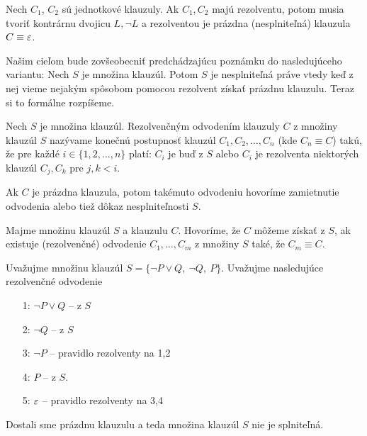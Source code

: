 \begin{poznamka}
    Nech $C_1$, $C_2$ sú jednotkové klauzuly. Ak $C_1,C_2$ majú
    rezolventu, potom musia tvoriť kontrárnu dvojicu $L, \neg L$
    a rezolventou je prázdna (nesplniteľná) klauzula $C \equiv \varepsilon$.
\end{poznamka}

Našim cieľom bude zovšeobecniť predchádzajúcu poznámku do
nasledujúceho variantu: Nech $S$ je množina klauzúl. Potom $S$ je
nesplniteľná práve vtedy keď z nej vieme nejakým spôsobom pomocou
rezolvent získať prázdnu klauzulu.
Teraz si to formálne rozpíšeme.

\begin{definicia}
    Nech $S$ je množina klauzúl.
    Rezolvenčným odvodením klauzuly $C$ z množiny klauzúl $S$
    nazývame konečnú postupnosť klauzúl $C_1, C_2, \ldots, C_n$ 
    (kde $C_n \equiv C$) takú,
    že pre každé $i \in \{1,2,\dots,n\}$ platí:
    $C_i$ je buď z $S$ alebo $C_i$ je rezolventa niektorých klauzúl
    $C_j, C_k$ pre $j, k < i$.

    Ak $C$ je prázdna klauzula, potom takémuto odvodeniu hovoríme 
    zamietnutie odvodenia alebo tiež dôkaz nesplniteľnosti $S$.
\end{definicia}

\begin{definicia}
    Majme množinu klauzúl $S$ a klauzulu $C$.
    Hovoríme, že $C$ môžeme získať z $S$,
    ak existuje (rezolvenčné) odvodenie $C_1, \dots, C_m$ z množiny $S$ také, že
    $C_m \equiv C$.
\end{definicia}

\begin{priklad}
    Uvažujme množinu klauzúl $S=\{\neg P \lor Q,\ \neg Q,\ P\}$.
    Uvažujme nasledujúce rezolvenčné odvodenie
    \begin{itemize} 
	\item[1:] $ \neg P \lor Q $  -- z $S$
	\item[2:] $ \neg Q $ -- z $S$
	\item[3:] $ \neg P $ -- pravidlo rezolventy na 1,2
	\item[4:] $ P $ -- z $S$.
        \item[5:] $\varepsilon$ -- pravidlo rezolventy na 3,4
    \end{itemize}
    Dostali sme prázdnu klauzulu a teda množina klauzúl $S$ nie je
    splniteľná.
\end{priklad}

